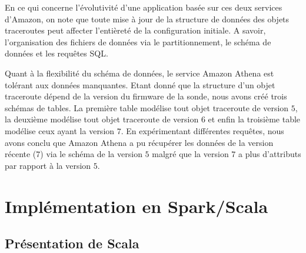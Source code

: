 En ce qui concerne l'évolutivité d'une application basée sur ces deux services d'Amazon, on note que toute mise à jour de la structure de données des objets traceroutes peut affecter l'entièreté de la configuration initiale. A savoir, l'organisation des fichiers de données via le partitionnement, le schéma de données et les requêtes SQL.

Quant à la flexibilité du schéma de données, le service  Amazon Athena est tolérant aux données manquantes. Etant donné que la structure d'un objet traceroute dépend de la version du firmware de la sonde, nous avons créé trois schémas de tables. La première table  modélise tout objet traceroute de  version $5$, la deuxième modélise tout objet traceroute de version $6$ et enfin la troisième table modélise ceux ayant la version $7$. En expérimentant différentes requêtes, nous avons conclu  que Amazon Athena a pu récupérer les données de la version récente ($7$) via le schéma de la version $5$ malgré que la version $7$ a plus d'attributs par rapport à la version $5$.




\section{Implémentation  en Spark/Scala} \label{application:spark}

\subsection{Présentation de Scala} \label{scala-presentation}


